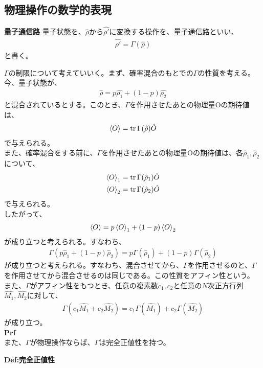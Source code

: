 \documentclass[a4paper,11pt]{jsarticle}
\begin{document}
\subsection{物理操作の数学的表現}
\begin{itembox}[l]{\textbf{量子通信路}}
    量子状態を、$\hat{\rho}から\hat{\rho'}$に変換する操作を、量子通信路といい、
    \begin{align}
        \hat{\rho'} = \Gamma(\hat{\rho})
    \end{align}
    と書く。
\end{itembox}
$\Gamma$の制限について考えていいく。まず、確率混合のもとでの$\Gamma$の性質を考える。\\
今、量子状態が、
\begin{align}
    \hat{\rho} = p\hat{\rho_1} + (1-p)\hat{\rho_2}
\end{align}
と混合されているとする。このとき、$\Gamma$を作用させたあとの物理量Oの期待値は、
\begin{align}
    \ev{O} = \trace{\Gamma(\hat{\rho})\hat{O}}
\end{align}
で与えられる。\\
また、確率混合をする前に、$\Gamma$を作用させたあとの物理量Oの期待値は、各$\hat{\rho}_1,\hat{\rho}_2$について、
\begin{align}
    \ev{O}_1 = \trace{\Gamma(\hat{\rho}_1)\hat{O}}\\
    \ev{O}_2 = \trace{\Gamma(\hat{\rho}_2)\hat{O}}
\end{align}
で与えられる。\\
したがって、
\begin{align}
    \ev{O} = p\ev{O}_1 + (1-p)\ev{O}_2
\end{align}
が成り立つと考えられる。すなわち、
\begin{align}
    \Gamma(p\hat{\rho}_1 + (1-p)\hat{\rho}_2) = p\Gamma(\hat{\rho}_1) + (1-p)\Gamma(\hat{\rho}_2)
\end{align}
が成り立つと考えられる。すなわち、混合させてから、$\Gamma$を作用させるのと、$\Gamma$を作用させてから混合させるのは同じである。この性質をアフィン性という。\\
また、$\Gamma$がアフィン性をもつとき、任意の複素数$c_1,c_2$と任意の$N$次正方行列$\hat{M_1},\hat{M_2}$に対して、
\begin{align}
    \Gamma(c_1\hat{M_1}+c_2\hat{M_2}) = c_1\Gamma(\hat{M_1})+c_2\Gamma(\hat{M_2})
\end{align}
が成り立つ。\\
\textbf{Prf}\\

また、$\Gamma$が物理操作ならば、$\Gamma$は完全正値性を持つ。
\begin{itembox}[l]{\textbf{Def:完全正値性}}
    
\end{itembox}
\end{document}
